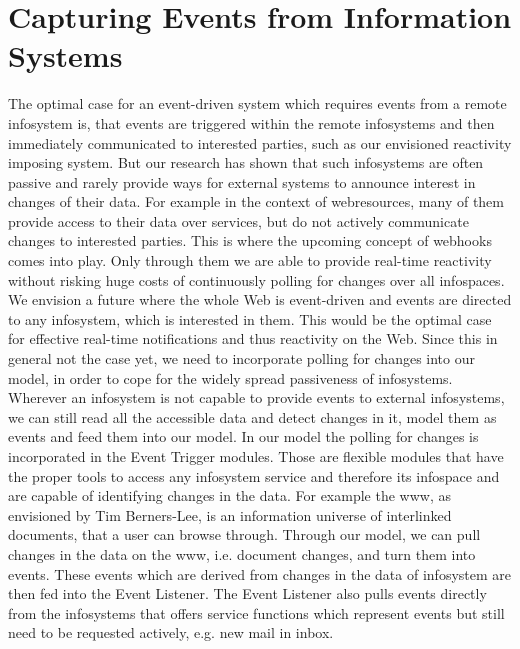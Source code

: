 \section{Capturing Events from Information Systems}
The optimal case for an event-driven system which requires events from a remote \textrm{\gls{infosystem}} is, that events are triggered within the remote \textrm{\glspl{infosystem}} and then immediately communicated to interested parties, such as our envisioned reactivity imposing system.
But our research has shown that such \textrm{\glspl{infosystem}} are often passive and rarely provide ways for external systems to announce interest in changes of their data.
For example in the context of \textrm{\glspl{webresource}}, many of them provide access to their data over services, but do not actively communicate changes to interested parties.
This is where the upcoming concept of \textrm{\glspl{webhook}} comes into play.
Only through them we are able to provide real-time reactivity without risking huge costs of continuously polling for changes over all \textrm{\glspl{infospace}}.
We envision a future where the whole Web is event-driven and events are directed to any \textrm{\gls{infosystem}}, which is interested in them.
This would be the optimal case for effective real-time notifications and thus reactivity on the Web.
Since this in general not the case yet, we need to incorporate polling for changes into our model, in order to cope for the widely spread passiveness of \textrm{\glspl{infosystem}}.
Wherever an \textrm{\gls{infosystem}} is not capable to provide events to external \textrm{\glspl{infosystem}}, we can still read all the accessible data and detect changes in it, model them as events and feed them into our model.
In our model the polling for changes is incorporated in the \textrm{Event Trigger} modules.
Those are flexible modules that have the proper tools to access any \textrm{\gls{infosystem}} service and therefore its \textrm{\gls{infospace}} and are capable of identifying changes in the data.
For example the \textrm{\gls{www}}, as envisioned by Tim Berners-Lee\cite{DBLP:journals/en/Berners-LeeCGP92}, is an information universe of interlinked documents, that a user can browse through.
Through our model, we can pull changes in the data on the \textrm{\gls{www}}, i.e. document changes, and turn them into events.
These events which are derived from changes in the data of \textrm{\gls{infosystem}} are then fed into the \textrm{Event Listener}.
The \textrm{Event Listener} also pulls events directly from the \textrm{\glspl{infosystem}} that offers service functions which represent events but still need to be requested actively, e.g. new mail in inbox.



